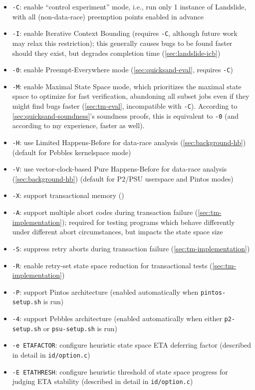 \begin{itemize}
	\item {\tt -C}: enable ``control experiment'' mode, i.e., run only 1 instance of Landslide, with all (non-data-race) preemption points enabled in advance
	\item {\tt -I}: enable Iterative Context Bounding (requires {\tt -C}, although future work may relax this restriction);
		this generally causes bugs to be found faster should they exist, but degrades completion time
		(\cref{sec:landslide-icb})
	\item {\tt -0}: enable Preempt-Everywhere mode (\cref{sec:quicksand-eval}, requires {\tt -C})
	\item {\tt -M}: enable Maximal State Space mode,
		which prioritizes the maximal state space to optimize for fast verification,
		abandoning all subset jobs even if they might find bugs faster
		(\cref{sec:tm-eval}, incompatible with {\tt -C}).
		According to \cref{sec:quicksand-soundness}'s soundness proofs,
		this is equivalent to {\tt -0}
		(and according to my experience,  faster as well).
	\item {\tt -H}: use Limited Happens-Before for data-race analysis (\cref{sec:background-hb})
		(default for Pebbles kernelspace mode)
	\item {\tt -V}: use vector-clock-based Pure Happens-Before for data-race analysis (\cref{sec:background-hb})
		(default for P2/PSU userspace and Pintos modes)
	\item {\tt -X}: support transactional memory ()
	\item {\tt -A}: support multiple abort codes during transaction failure (\cref{sec:tm-implementation});
		required for testing programs which behave differently under different abort circumstances,
		but impacts the state space size
	\item {\tt -S}: suppress retry aborts during transaction failure (\cref{sec:tm-implementation})
	\item {\tt -R}: enable retry-set state space reduction for transactional tests (\cref{sec:tm-implementation})
	\item {\tt -P}: support Pintos architecture (enabled automatically when {\tt pintos-setup.sh} is run)
	\item {\tt -4}: support Pebbles architecture (enabled automatically when either {\tt p2-setup.sh} or {\tt psu-setup.sh} is run)
	\item {\tt -e ETAFACTOR}: configure heuristic state space ETA deferring factor (described in detail in {\tt id/option.c})
	\item {\tt -E ETATHRESH}: configure heuristic threshold of state space progress for judging ETA stability (described in detail in {\tt id/option.c})
\end{itemize}

